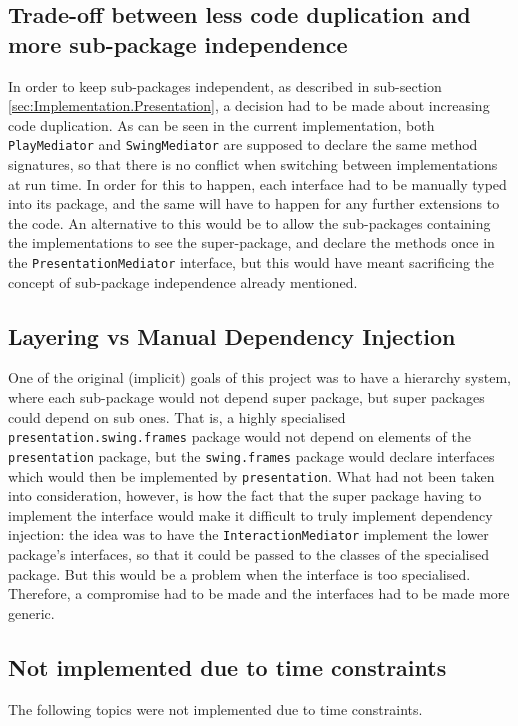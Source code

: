 \subsection{Trade-off between less code duplication and more sub-package independence} \label{sec:Reflections.tradeoffs}
In order to keep sub-packages independent, as described in sub-section
\ref{sec:Implementation.Presentation}, a decision had to be made about
increasing code duplication. As can be seen in the current implementation, both
\texttt{PlayMediator} and \texttt{SwingMediator} are supposed to declare the
same method signatures, so that there is no conflict when switching between
implementations at run time. In order for this to happen, each interface had to
be manually typed into its package, and the same will have to happen for any
further extensions to the code. An alternative to this would be to allow the
sub-packages containing the implementations to see the super-package, and
declare the methods once in the \texttt{PresentationMediator} interface, but
this would have meant sacrificing the concept of sub-package independence
already mentioned.

\subsection{Layering vs Manual Dependency Injection}
One of the original (implicit) goals of this project was to have a hierarchy
system, where each sub-package would not depend super package, but super
packages could depend on sub ones. That is, a highly specialised
\texttt{presentation.swing.frames} package would not depend on elements of the
\texttt{presentation} package, but the \texttt{swing.frames} package would
declare interfaces which would then be implemented by \texttt{presentation}.
What had not been taken into consideration, however, is how the fact that the
super package having to implement the interface would make it difficult to
truly implement dependency injection: the idea was to have the
\texttt{InteractionMediator} implement the lower package's interfaces, so that
it could be passed to the classes of the specialised package. But this would be
a problem when the interface is too specialised. Therefore, a compromise had to
be made and the interfaces had to be made more generic.

\subsection{Not implemented due to time constraints} \label{sec:Reflections.TimeConstraints}
The following topics were not implemented due to time constraints.

